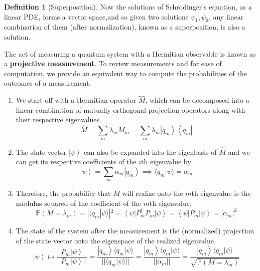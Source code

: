 \documentclass{article}
\newcommand{\ket}[1]{\ensuremath{\left|#1\right\rangle}}
\newcommand{\bra}[1]{\ensuremath{\left\langle#1\right|}}
\newcommand{\braket}[2]{\langle #1 | #2 \rangle}
\theoremstyle{definition}
\newtheorem{definition}{Definition}[section]
\begin{document}
  \begin{definition}[Superposition]
    Now the solutions of Schrodinger's equation, as a linear PDE, forms a vector space,and so given two solutions $\psi_1, \psi_2$, any linear combination of them (after normalization), known as a superposition, is also a solution.
  \end{definition}

  The act of measuring a quantum system with a Hermitian observable is known as a \textbf{projective measurement}. To review measurements and for ease of computation, we provide an equivalent way to compute the probabilities of the outcomes of a measurement. 

  \begin{enumerate} 
    \item We start off with a Hermitian operator $\hat{M}$, which can be decomposed into a linear combination of mutually orthogonal projection operators along with their respective eigenvalues. 
      \begin{equation} 
        \hat{M} = \sum_m \lambda_m M_m = \sum_{m} \lambda_m \ket{q_m} \bra{q_m}
      \end{equation}

    \item The state vector $\ket{\psi}$ can also be expanded into the eigenbasis of $\hat{M}$ and we can get its respective coefficients of the $i$th eigenvalue by 
      \begin{equation} 
        \ket{\psi} = \sum_{m} \alpha_m \ket{q_m} \implies \braket{q_m}{\psi} = \alpha_m
      \end{equation}

    \item Therefore, the probability that $M$ will realize onto the $m$th eigenvalue is the modulus squared of the coefficient of the $m$th eigenvalue. 
      \begin{equation} 
        \mathbb{P}(M = \lambda_m) = |\braket{q_m}{\psi}|^2 = \bra{\psi} P_m^\dagger P_m \ket{\psi} = \bra{\psi} P_m \ket{\psi} = |\alpha_m|^2
      \end{equation}

    \item The state of the system after the measurement is the (normalized) projection of the state vector onto the eigenspace of the realized eigenvalue. 
      \begin{equation} 
        \ket{\psi} \mapsto \frac{P_m \ket{\psi}}{||P_m \ket{\psi}||} = \frac{\ket{q_m} \braket{q_m}{\psi}}{||\braket{q_m}{\psi}||} = \frac{\ket{q_m} \braket{q_m}{\psi}}{||\alpha_m||} = \frac{\ket{q_m} \braket{q_m}{\psi}}{\sqrt{\mathbb{P}(M = \lambda_m)}}
      \end{equation}
  \end{enumerate}
\end{document}

